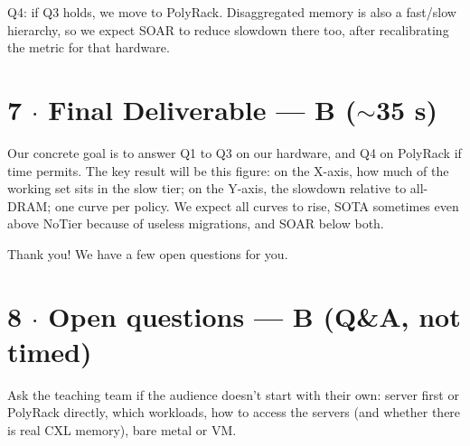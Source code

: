 \documentclass[11pt]{article}
\begin{document}
Q4: if Q3 holds, we move to PolyRack. Disaggregated memory is also a fast/slow
hierarchy, so we expect SOAR to reduce slowdown there too, after recalibrating
the metric for that hardware.

\section{7 $\cdot$ Final Deliverable --- B ($\sim$35 s)}
Our concrete goal is to answer Q1 to Q3 on our hardware, and Q4 on PolyRack if
time permits. The key result will be this figure: on the X-axis, how much of
the working set sits in the slow tier; on the Y-axis, the slowdown relative to
all-DRAM; one curve per policy. We expect all curves to rise, SOTA sometimes
even above NoTier because of useless migrations, and SOAR below both.

Thank you! We have a few open questions for you.

\section{8 $\cdot$ Open questions --- B (Q\&A, not timed)}
Ask the teaching team if the audience doesn't start with their own: server
first or PolyRack directly, which workloads, how to access the servers (and
whether there is real CXL memory), bare metal or VM.

\hrulefill
\end{document}
